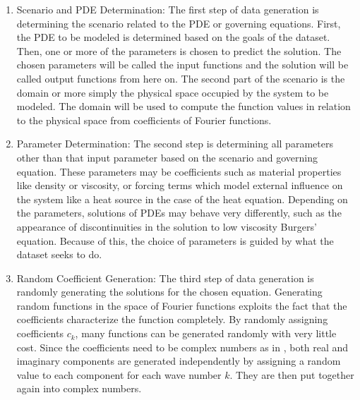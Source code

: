 \begin{enumerate}
  \item Scenario and PDE Determination:
    The first step of data generation is determining the scenario related to the PDE or governing equations. First, the PDE to be modeled is determined based on the goals of the dataset. Then, one or more of the parameters is chosen to predict the solution. The chosen parameters will be called the input functions and the solution will be called output functions from here on. The second part of the scenario is the domain or more simply the physical space occupied by the system to be modeled. The domain will be used to compute the function values in relation to the physical space from coefficients of Fourier functions.
  \item Parameter Determination:
    The second step is determining all parameters other than that input parameter based on the scenario and governing equation. These parameters may be coefficients such as material properties like density or viscosity, or forcing terms which model external influence on the system like a heat source in the case of the heat equation. Depending on the parameters, solutions of PDEs may behave very differently, such as the appearance of discontinuities in the solution to low viscosity Burgers' equation. Because of this, the choice of parameters is guided by what the dataset seeks to do.
  \item Random Coefficient Generation:
    The third step of data generation is randomly generating the solutions for the chosen equation. Generating random functions in the space of Fourier functions exploits the fact that the coefficients characterize the function completely. By randomly assigning coefficients \(c_k\), many functions can be generated randomly with very little cost. Since the coefficients need to be complex numbers as in , both real and imaginary components are generated independently by assigning a random value to each component for each wave number \(k\). They are then put together again into complex numbers.


\end{enumerate}
